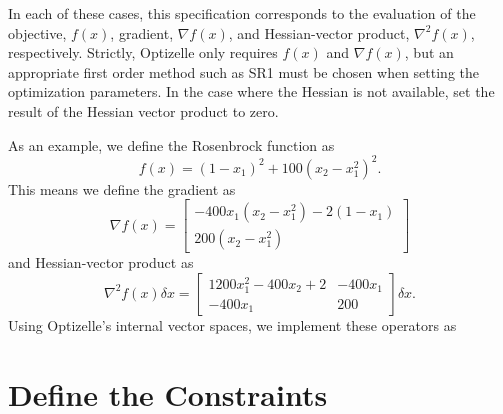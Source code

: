 \documentclass{report}
\begin{document}
        In each of these cases, this specification corresponds to the evaluation of the objective, $f(x)$, gradient, $\nabla f(x)$, and Hessian-vector product, $\nabla^2 f(x)$, respectively.  Strictly, Optizelle only requires $f(x)$ and $\nabla f(x)$, but an appropriate first order method such as SR1 must be chosen when setting the optimization parameters.  In the case where the Hessian is not available, set the result of the Hessian vector product to zero. 

        As an example, we define the Rosenbrock function as
$$
        f(x)=(1-x_1)^2+100(x_2-x_1^2)^2.
$$
This means we define the gradient as
$$
        \nabla f(x)=\begin{bmatrix}
        -400x_1(x_2-x_1^2)-2(1-x_1)\\
        200(x_2-x_1^2)
        \end{bmatrix}
$$
and Hessian-vector product as
$$
        \nabla^2 f(x)\delta x=
        \begin{bmatrix}
            1200x_1^2-400x_2+2 & -400x_1\\
            -400x_1 & 200
        \end{bmatrix}\delta x.
$$
Using Optizelle's internal vector spaces, we implement these operators as


\section{Define the Constraints}
\end{document}
